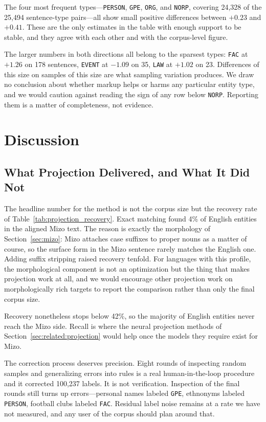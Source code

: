 \documentclass[acmsmall,screen,review]{acmart}
\begin{document}
The four most frequent types---\texttt{PERSON}, \texttt{GPE}, \texttt{ORG}, and
\texttt{NORP}, covering 24,328 of the 25,494 sentence-type pairs---all show
small positive differences between $+0.23$ and $+0.41$. These are the only
estimates in the table with enough support to be stable, and they agree with
each other and with the corpus-level figure.

The larger numbers in both directions all belong to the sparsest types:
\texttt{FAC} at $+1.26$ on 178 sentences, \texttt{EVENT} at $-1.09$ on 35,
\texttt{LAW} at $+1.02$ on 23. Differences of this size on samples of this size
are what sampling variation produces. We draw no conclusion about whether markup
helps or harms any particular entity type, and we would caution against reading
the sign of any row below \texttt{NORP}. Reporting them is a matter of
completeness, not evidence.

\section{Discussion}
\label{sec:discussion}

\subsection{What Projection Delivered, and What It Did Not}
\label{sec:discussion:projection}

The headline number for the method is not the corpus size but the recovery rate
of Table~\ref{tab:projection_recovery}. Exact matching found 4\% of English
entities in the aligned Mizo text. The reason is exactly the morphology of
Section~\ref{sec:mizo}: Mizo attaches case suffixes to proper nouns as a matter
of course, so the surface form in the Mizo sentence rarely matches the English
one. Adding suffix stripping raised recovery tenfold. For languages with this
profile, the morphological component is not an optimization but the thing that
makes projection work at all, and we would encourage other projection work on
morphologically rich targets to report the comparison rather than only the final
corpus size.

Recovery nonetheless stops below 42\%, so the majority of English entities never
reach the Mizo side. Recall is where the neural projection methods of
Section~\ref{sec:related:projection} would help once the models they require
exist for Mizo.

The correction process deserves precision. Eight rounds of inspecting random
samples and generalizing errors into rules is a real human-in-the-loop procedure
and it corrected 100,237 labels. It is not verification. Inspection of the final
rounds still turns up errors---personal names labeled \texttt{GPE}, ethnonyms
labeled \texttt{PERSON}, football clubs labeled \texttt{FAC}. Residual label
noise remains at a rate we have not measured, and any user of the corpus should
plan around that.
\end{document}
